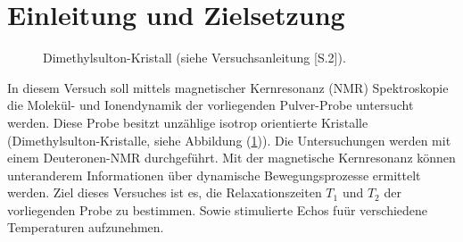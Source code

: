 \section{Einleitung und Zielsetzung}
\begin{figure}
	\centering
	\vspace{-10pt}
	\caption{Di{\-}me{\-}thyl{\-}sul{\-}ton-Kristall (siehe Versuchsanleitung \cite{Anleitung}[S.2]).}
	\label{probe}
\end{figure}
In diesem Versuch soll mittels magnetischer Kernresonanz (NMR) Spektroskopie die Molek\"{u}l- und Ionendynamik der vorliegenden Pulver-Probe untersucht werden.
Diese Probe besitzt unz\"{a}hlige isotrop orientierte Kristalle (Dimethylsulton-Kristalle, siehe Abbildung (\ref{probe})).
Die Untersuchungen werden mit einem Deuteronen-NMR durchgef\"{u}hrt.
Mit der magnetische Kernresonanz k\"{o}nnen unteranderem Informationen \"{u}ber dynamische Bewegungspro{\-}zesse ermittelt werden.
Ziel dieses Versuches ist es, die Relaxationszeiten $T_1$ und $T_2$ der vorliegenden Probe zu bestimmen.
Sowie stimulierte Echos fu\"{u}r verschiedene Temperaturen aufzunehmen.
